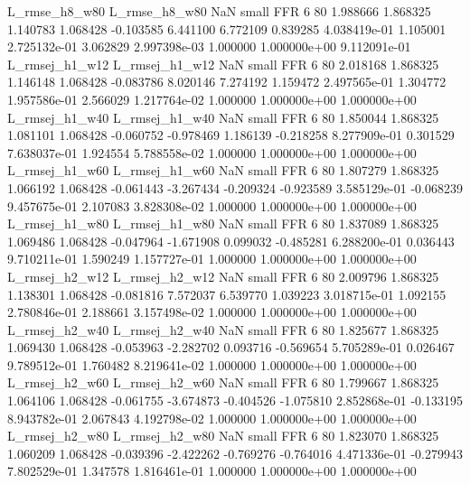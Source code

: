 L_rmse_h8_w80  L_rmse_h8_w80                   NaN      small      FFR                 6 80 1.988666       1.868325 1.140783       1.068428   -0.103585      6.441100      6.772109     0.839285   4.038419e-01  1.105001 2.725132e-01     3.062829   2.997398e-03            1.000000    1.000000e+00        9.112091e-01
L_rmsej_h1_w12 L_rmsej_h1_w12                   NaN      small      FFR                 6 80 2.018168       1.868325 1.146148       1.068428   -0.083786      8.020146      7.274192     1.159472   2.497565e-01  1.304772 1.957586e-01     2.566029   1.217764e-02            1.000000    1.000000e+00        1.000000e+00
L_rmsej_h1_w40 L_rmsej_h1_w40                   NaN      small      FFR                 6 80 1.850044       1.868325 1.081101       1.068428   -0.060752     -0.978469      1.186139    -0.218258   8.277909e-01  0.301529 7.638037e-01     1.924554   5.788558e-02            1.000000    1.000000e+00        1.000000e+00
L_rmsej_h1_w60 L_rmsej_h1_w60                   NaN      small      FFR                 6 80 1.807279       1.868325 1.066192       1.068428   -0.061443     -3.267434     -0.209324    -0.923589   3.585129e-01 -0.068239 9.457675e-01     2.107083   3.828308e-02            1.000000    1.000000e+00        1.000000e+00
L_rmsej_h1_w80 L_rmsej_h1_w80                   NaN      small      FFR                 6 80 1.837089       1.868325 1.069486       1.068428   -0.047964     -1.671908      0.099032    -0.485281   6.288200e-01  0.036443 9.710211e-01     1.590249   1.157727e-01            1.000000    1.000000e+00        1.000000e+00
L_rmsej_h2_w12 L_rmsej_h2_w12                   NaN      small      FFR                 6 80 2.009796       1.868325 1.138301       1.068428   -0.081816      7.572037      6.539770     1.039223   3.018715e-01  1.092155 2.780846e-01     2.188661   3.157498e-02            1.000000    1.000000e+00        1.000000e+00
L_rmsej_h2_w40 L_rmsej_h2_w40                   NaN      small      FFR                 6 80 1.825677       1.868325 1.069430       1.068428   -0.053963     -2.282702      0.093716    -0.569654   5.705289e-01  0.026467 9.789512e-01     1.760482   8.219641e-02            1.000000    1.000000e+00        1.000000e+00
L_rmsej_h2_w60 L_rmsej_h2_w60                   NaN      small      FFR                 6 80 1.799667       1.868325 1.064106       1.068428   -0.061755     -3.674873     -0.404526    -1.075810   2.852868e-01 -0.133195 8.943782e-01     2.067843   4.192798e-02            1.000000    1.000000e+00        1.000000e+00
L_rmsej_h2_w80 L_rmsej_h2_w80                   NaN      small      FFR                 6 80 1.823070       1.868325 1.060209       1.068428   -0.039396     -2.422262     -0.769276    -0.764016   4.471336e-01 -0.279943 7.802529e-01     1.347578   1.816461e-01            1.000000    1.000000e+00        1.000000e+00
